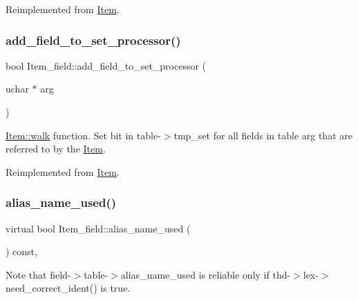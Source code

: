 Reimplemented from \mbox{\hyperlink{classItem_a1ddf19c11395fc67c33b8bb38ce67fc7}{Item}}.

\mbox{\label{classItem__field_accdc70183bdbc1279be2ef8d3f0ab042}} 
\subsubsection{\texorpdfstring{add\+\_\+field\+\_\+to\+\_\+set\+\_\+processor()}{add\_field\_to\_set\_processor()}}
{\footnotesize\ttfamily bool Item\+\_\+field\+::add\+\_\+field\+\_\+to\+\_\+set\+\_\+processor (\begin{DoxyParamCaption}\item[{uchar $\ast$}]{arg }\end{DoxyParamCaption})\hspace{0.3cm}{\ttfamily [virtual]}}

\mbox{\hyperlink{classItem_ab7d2529511c14a77e59a1b1bbabc95d7}{Item\+::walk}} function. Set bit in table-\/$>$tmp\+\_\+set for all fields in table \textquotesingle{}arg\textquotesingle{} that are referred to by the \mbox{\hyperlink{classItem}{Item}}. 

Reimplemented from \mbox{\hyperlink{classItem_ad26ce6d5e983b547db3e32efa17a36df}{Item}}.

\mbox{\label{classItem__field_aff70313ac49d91b6b51e522b8ac4cb30}} 
\subsubsection{\texorpdfstring{alias\+\_\+name\+\_\+used()}{alias\_name\_used()}}
{\footnotesize\ttfamily virtual bool Item\+\_\+field\+::alias\+\_\+name\+\_\+used (\begin{DoxyParamCaption}{ }\end{DoxyParamCaption}) const\hspace{0.3cm}{\ttfamily [inline]}, {\ttfamily [virtual]}}

\begin{DoxyNote}{Note}
that field-\/$>$table-\/$>$alias\+\_\+name\+\_\+used is reliable only if thd-\/$>$lex-\/$>$need\+\_\+correct\+\_\+ident() is true. 
\end{DoxyNote}


